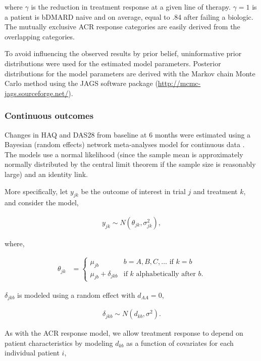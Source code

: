\documentclass[11pt,final,fleqn]{article}\usepackage[]{graphicx}\usepackage[]{color}
\theoremstyle{plain}
\begin{document}
\begin{appendices}
where $\gamma$ is the reduction in treatment response at a given line of therapy. $\gamma = 1$ is a patient is bDMARD naive and on average, equal to .84 after failing a biologic. The mutually exclusive ACR response categories are easily derived from the overlapping categories. 

To avoid influencing the observed results by prior belief, uninformative prior distributions were used for the estimated model parameters. Posterior distributions for the model parameters are derived with the Markov chain Monte Carlo method using the JAGS software package (\url{http://mcmc-jags.sourceforge.net/}).

\subsubsection{Continuous outcomes}

Changes in HAQ and DAS28 from baseline at 6 months were estimated using a Bayesian (random effects) network meta-analyses model for continuous data \citep{dias2013evidence}. The models use a normal likelihood (since the sample mean is approximately normally distributed by the central limit theorem if the sample size is reasonably large) and an identity link. 

More specifically, let $y_{jk}$ be the outcome of interest in trial $j$ and treatment $k$, and consider the model,

\begin{align}
y_{jk} \sim N(\theta_{jk}, \sigma^2_{jk}),
\end{align}

where,

\begin{align}
\theta_{jk} &=
 \begin{cases}
     \mu_{jb} & b=A,B,C,\ldots \text{ if } k = b \\
     \mu_{jb} + \delta_{jkb} & \text{if $k$ alphabetically after } b.
  \end{cases}
\end{align}

$\delta_{jkb}$ is modeled using a random effect with $d_{AA} =0$,

\begin{align}
\delta_{jkb} \sim N(d_{kb}, \sigma^2).
\end{align}

As with the ACR response model, we allow treatment response to depend on patient characteristics by modeling $d_{kb}$ as a function of covariates for each individual patient $i$,


\end{appendices}
\end{document}
